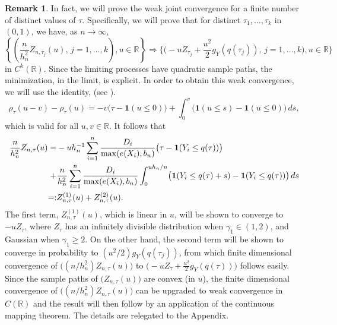 \documentclass[12pt]{amsart}
\newcommand{\R}{\mathbb{R}}
\newcommand{\bbr}{\mathbb{R}}
\newcommand{\1}{\mathbbm{1}}
\newcommand{\0}{\mathbf{0}}
\newcommand{\one}{\mathbf{1}}
\theoremstyle{plain}
\theoremstyle{definition}
\newtheorem{remark}[theorem]{Remark}
\begin{document}
\begin{remark}
In fact, we will prove the weak joint convergence for a finite number of distinct values of $\tau$. Specifically, we will prove that 
   for distinct $\tau_1,\ldots, \tau_k$ in $(0,1)$, we have, as $n\to\infty$,
 \begin{equation} \label{e:big.conv}
 \left\{\left( \frac{n}{h_n^2} Z_{n,\tau_j} (u),\, j=1,\ldots, k\right), u\in\R \right\}
 \Rightarrow \bigl\{\bigl( -uZ_{\tau_j}+\frac{u^2}{2}g_Y(q(\tau_j)), \, j=1,\ldots, k\bigr), u\in\R\bigr\}
\end{equation}
%
in $C^k(\R)$. Since the limiting processes have quadratic sample paths, the minimization, in the limit, is  explicit.
%
In order to obtain this weak convergence, we will use the identity,  (see \cite[p. 121]{koenker2005}). 
%
 \begin{equation} \label{e:identity}
  \rho_\tau(u-v)-\rho_\tau(u) = -v\bigl( \tau-\one(u\leq 0)\bigr) +
  \int_0^v \bigl( \one(u\leq s)-\one(u\leq 0)\bigr)\, ds,
\end{equation}
%
which is valid for all $u,v\in\bbr$.  It follows that
%
\begin{align} \label{e:split.Zn}
\frac{n}{h_n^2}Z_{n,\tau}(u) =& -uh_n^{-1} \sum_{i=1}^n \frac{D_i}{\max(e(X_i),b_n)}
  \bigl( \tau-\one(Y_i\leq q(\tau))\bigr) \\
\notag +& \frac{n}{h_n^2}\sum_{i=1}^n \frac{D_i}{\max(e(X_i),b_n)}\int_0^{uh_n/n}
          \bigl( \one(Y_i\leq q(\tau)+s)-\one(Y_i\leq q(\tau))\bigr)\,
          ds \\
\notag =:& Z^{(1)}_{n,\tau}(u)+ Z^{(2)}_{n,\tau}(u). 
\end{align} 
%
The first term, $Z^{(1)}_{n,\tau}(u)$, which is linear in $u$, will be shown to converge to 
$-uZ_{\tau}$, where $Z_\tau$ has an infinitely divisible distribution  when $\gamma_1\in (1,2)$, and Gaussian when $\gamma_1\geq 2$.  On the other hand, the second term will be shown to converge in probability to $(u^2/2)g_Y(q(\tau_j))$, from which finite dimensional convergence of  $\bigl((n/h_n^2)Z_{n,\tau}(u)\bigr)$ to $\bigl(-uZ_{\tau}+\frac{u^2}{2}g_Y(q(\tau))\bigr)$ follows easily.  Since the sample paths of $\bigl(Z_{n,\tau}(u)\bigr)$ are convex (in $u$), the finite dimensional convergence of $\bigl((n/h_n^2)Z_{n,\tau}(u)\bigr)$ can be upgraded to weak convergence in $C(\R)$  and the result will then follow by an application of the continuous mapping theorem.  The details are  relegated to the Appendix.  
\end{remark}
\end{document}

